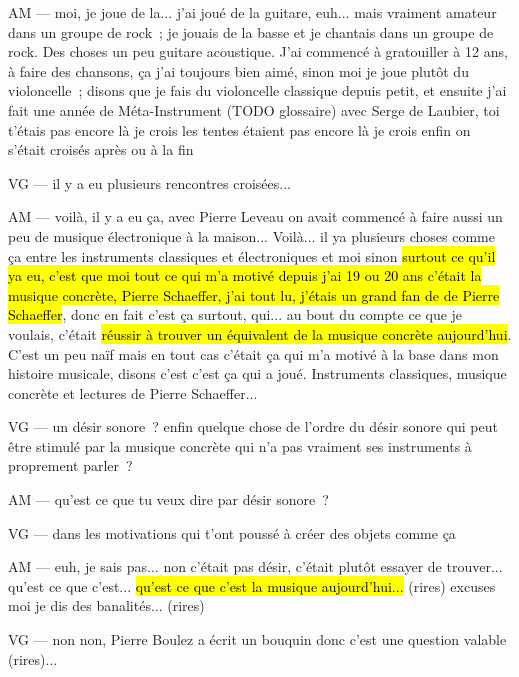 AM — moi, je joue de la... j'ai joué de la guitare, euh... mais vraiment amateur dans un groupe de rock ; je jouais de la basse et je chantais dans un groupe de rock. Des choses un peu guitare acoustique. J'ai commencé à gratouiller à 12 ans, à faire des chansons, ça j'ai toujours bien aimé, sinon moi je joue plutôt du violoncelle ; disons que je fais du violoncelle classique depuis petit, et ensuite j'ai fait une année de Méta-Instrument (TODO glossaire) avec Serge de Laubier, toi t'étais pas encore là je crois les tentes étaient pas encore là je crois enfin on s'était croisés après ou à la fin 

VG — il y a eu plusieurs rencontres croisées... 

AM — voilà, il y a eu ça, avec Pierre Leveau on avait commencé à faire aussi un peu de musique électronique à la maison... Voilà... il ya plusieurs choses comme ça entre les instruments classiques et électroniques et moi sinon \hl{surtout ce qu'il ya eu, c'est que moi tout ce qui m'a motivé depuis j'ai 19 ou 20 ans c'était la musique concrète, Pierre Schaeffer, j'ai tout lu, j'étais un grand fan de de Pierre Schaeffer}, donc en fait c'est ça surtout, qui... au bout du compte ce que je voulais, c'était \hl{réussir à trouver un équivalent de la musique concrète aujourd'hui}. C'est un peu naïf mais en tout cas c'était ça qui m'a motivé à la base dans mon histoire musicale, disons c'est c'est ça qui a joué. Instruments classiques, musique concrète et lectures de Pierre Schaeffer... 

VG — un désir sonore ? enfin quelque chose de l'ordre du désir sonore qui peut être stimulé par la musique concrète qui n'a pas vraiment ses instruments à proprement parler ?

AM — qu'est ce que tu veux dire par désir sonore ?

VG — dans les motivations qui t'ont poussé à créer des objets comme ça 

AM — euh, je sais pas... non c'était pas désir, c'était plutôt essayer de trouver... qu'est ce que c'est... \hl{qu'est ce que c'est la musique aujourd'hui...} (rires) excuses moi je dis des banalités... (rires)

VG — non non, Pierre Boulez a écrit un bouquin donc c'est une question valable (rires)... 


